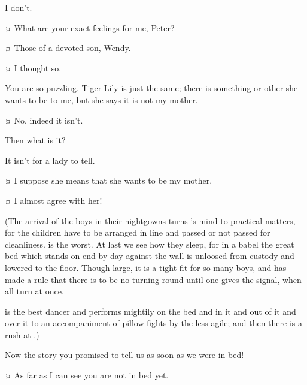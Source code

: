 \begin{drama}
\peterspeaks
I don’t.

\wendyspeaks {}¤
What are your exact feelings for me, Peter?

\peterspeaks {}¤
Those of a devoted son, Wendy.

\wendyspeaks {}¤
I thought so.

\peterspeaks
You are so puzzling.
Tiger Lily is just the same; there is something or other she wants to be to me,
but she says it is not my mother.

\wendyspeaks {}¤
No, indeed it isn’t.

\peterspeaks
Then what is it?

\wendyspeaks
It isn’t for a lady to tell.


\peterspeaks {}¤
I suppose she means that she wants to be my mother.


\wendyspeaks {}¤
I almost agree with her!

\begin{stagedir}
(The arrival of the boys in their nightgowns turns \wendy’s mind to practical matters,
for the children have to be arranged in line and passed or not passed for cleanliness.
\slightly is the worst.
At last we see how they sleep,
for in a babel the great bed which stands on end by day against the wall is unloosed from custody
and lowered to the floor.
Though large, it is a tight fit for so many boys,
and \wendy has made a rule that there is to be no turning round until one gives the signal, when all turn at once.

\firsttwin is the best dancer and performs mightily on the bed and in it and out of it and over it
to an accompaniment of pillow fights by the less agile;
and then there is a rush at \wendy.)
\end{stagedir}

\nibsspeaks
Now the story you promised to tell us as soon as we were in bed!

\wendyspeaks {}¤
As far as I can see you are not in bed yet.



\end{drama}
